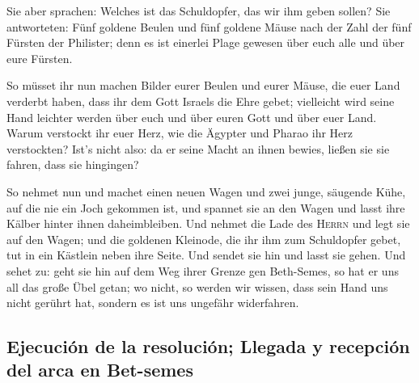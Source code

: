  Sie aber sprachen: Welches ist das Schuldopfer, das wir
ihm geben sollen? Sie antworteten: Fünf goldene Beulen und fünf goldene
Mäuse nach der Zahl der fünf Fürsten der Philister; denn es ist einerlei
Plage gewesen über euch alle und über eure Fürsten.

 So müsset ihr nun machen Bilder eurer Beulen und eurer
Mäuse, die euer Land verderbt haben, dass ihr dem Gott Israels die Ehre
gebet; vielleicht wird seine Hand leichter werden über euch und über
euren Gott und über euer Land.  Warum verstockt ihr euer
Herz, wie die Ägypter und Pharao ihr Herz verstockten? Ist's nicht also:
da er seine Macht an ihnen bewies, ließen sie sie fahren, dass sie
hingingen?

 So nehmet nun und machet einen neuen Wagen und zwei
junge, säugende Kühe, auf die nie ein Joch gekommen ist, und spannet sie
an den Wagen und lasst ihre Kälber hinter ihnen daheimbleiben.
 Und nehmet die Lade des \textsc{Herrn} und legt sie auf
den Wagen; und die goldenen Kleinode, die ihr ihm zum Schuldopfer gebet,
tut in ein Kästlein neben ihre Seite. Und sendet sie hin und lasst sie
gehen.  Und sehet zu: geht sie hin auf dem Weg ihrer
Grenze gen Beth-Semes, so hat er uns all das große Übel getan; wo nicht,
so werden wir wissen, dass sein Hand uns nicht gerührt hat, sondern es
ist uns ungefähr widerfahren.

\hypertarget{ejecuciuxf3n-de-la-resoluciuxf3n-llegada-y-recepciuxf3n-del-arca-en-bet-semes}{%
\subsection{Ejecución de la resolución; Llegada y recepción del arca en
Bet-semes}\label{ejecuciuxf3n-de-la-resoluciuxf3n-llegada-y-recepciuxf3n-del-arca-en-bet-semes}}

